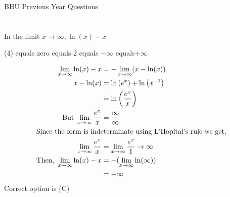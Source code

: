 \newpage
\begin{abox}
	BHU Previous Year Questions
\end{abox}
\section*{}

\begin{questions}
	\begin{minipage}{\textwidth}
		\question In the limit $x \rightarrow \infty, \ln (x)-x$
	\end{minipage}
	\begin{tasks}(4)
		\task[\textbf{A.}] equals zero
		\task[\textbf{B.}]equals 2
		\task[\textbf{C.}]equals $-\infty$
		\task[\textbf{D.}] equals$+\infty$
	\end{tasks}
	\begin{answer}
		\begin{align*}
		\lim _{x \rightarrow \infty} \ln(x)-x&=-\lim _{x \rightarrow \infty}  (x-\ln (x))\\\
		x-\ln (x) 
		&=\ln \left(e^{x}\right)+\ln \left(x^{-1}\right) \\
		&=\ln \left(\frac{e^{x}}{x}\right)\\\text{But }\lim _{x \rightarrow \infty} \frac{e^{x}}{x}&=\frac{\infty}{\infty}\\
		\intertext{Since the form is indeterminate using L'Hopital's rule we get,}
		\lim _{x \rightarrow \infty} \frac{e^{x}}{x}&=\lim _{x \rightarrow \infty} \frac{e^{x}}{1} \rightarrow \infty\\
		\text{Then,}\ \lim _{x \rightarrow \infty} \ln(x)-x&=-(\lim _{x \rightarrow \infty} \ln(\infty))\\&=-\infty
		\end{align*}
		Correct option is (C)
	\end{answer}
	

\end{questions}
